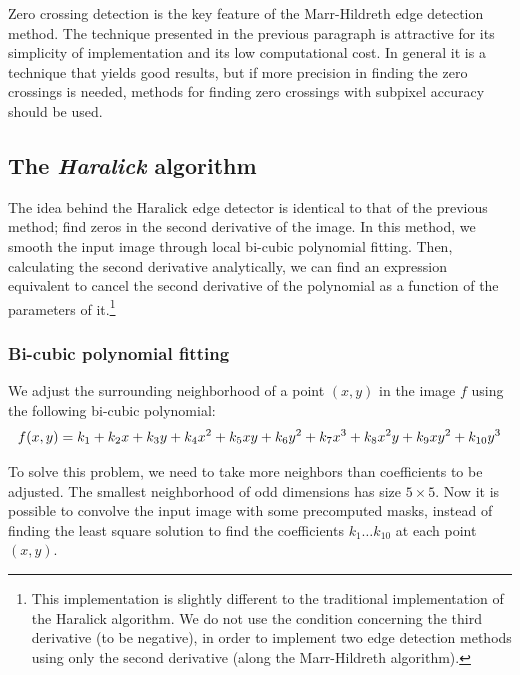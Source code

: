 \documentclass{ipol}
\numberwithin{equation}{section}
\numberwithin{table}{section}
\numberwithin{figure}{section}
\begin{document}
Zero crossing detection is the key feature of the Marr-Hildreth edge detection method. The technique 
presented in the previous paragraph is attractive for its simplicity of implementation and its low 
computational cost. In general it is a technique that yields good results, but if more precision in 
finding the zero crossings is needed, methods for finding zero crossings with subpixel accuracy 
should be used.\\

\subsection{The \textit{Haralick} algorithm}

The idea behind the Haralick edge detector is identical to that of the previous method; find zeros in 
the second derivative of the image. In this method, we smooth the input image through local bi-cubic
polynomial fitting. Then, calculating the second derivative analytically, we can find an expression 
equivalent to cancel the second derivative of the polynomial as a function of the parameters of it.\footnote{This implementation is slightly 
different to the traditional implementation of the Haralick algorithm. We do not use the condition concerning the third derivative (to be negative), in order to implement two edge detection methods using only the second derivative (along the Marr-Hildreth algorithm).}\\

\subsubsection{Bi-cubic polynomial fitting}
\label{sec:bicubic}

We adjust the surrounding neighborhood of a point $(x,y)$ in the image $f$ using the following bi-cubic polynomial:
\begin{equation}
	\label{eq:bicubic}
	f(x,y) = k_1 + k_2x + k_3y + k_4x^2 + k_5xy + k_6y^2 + k_7x^3 + k_8x^2y + k_9xy^2 + k_{10}y^3\\
\end{equation}

To solve this problem, we need to take more neighbors than coefficients to be adjusted. The smallest 
neighborhood of odd dimensions has size $5\times5$. Now it is possible to convolve the input image
with some precomputed masks, instead of finding the least square solution to find the coefficients 
$k_1\dots k_{10}$ at each point $(x,y)$.\\
\end{document}
